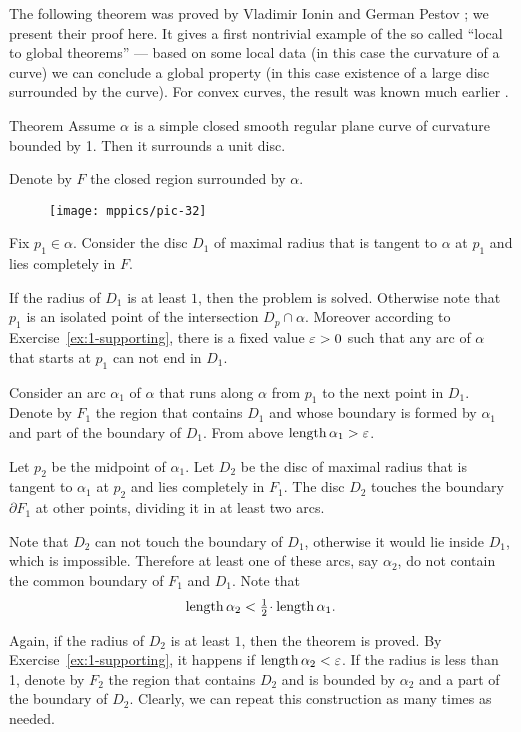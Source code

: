 The following theorem was proved by Vladimir Ionin and German Pestov \cite{pestov-ionin}; we present their proof here.
It gives a first nontrivial example of the so called ``local to global theorems'' --- based on some local data (in this case the curvature of a curve) we can conclude a global property (in this case existence of a large disc surrounded by the curve).
For convex curves, the result was known much earlier \cite[\S 24]{blaschke}.

\begin{thm}{Theorem}\label{thm:moon}
Assume $\alpha$ is a simple closed smooth regular plane curve of curvature bounded by 1.
Then it surrounds a unit disc.
\end{thm}

Denote by $F$ the closed region surrounded by $\alpha$. 

\begin{figure}[h!]%
\vskip-0mm
\centering
\texttt{[image: mppics/pic-32]}
\vskip0mm
\end{figure}

Fix $p_1\in \alpha$.
Consider the disc $D_1$ of maximal radius 
that is tangent to $\alpha$ at $p_1$ and lies completely in $F$.

If the radius of $D_1$ is at least $1$, then the problem is solved.
Otherwise note that $p_1$ is an isolated point of the intersection $D_p\cap \alpha$.
Moreover according to Exercise~\ref{ex:1-supporting}, there is a fixed value $\varepsilon>0$ such that any arc of $\alpha$
that starts at $p_1$ can not end in $D_1$.


Consider an arc $\alpha_1$ of $\alpha$ that runs along $\alpha$ from $p_1$ to the next point in $D_1$.
Denote by $F_1$ the region that contains $D_1$ and whose boundary is formed by $\alpha_1$ and part of the boundary of $D_1$.
From above $\mathop{\rm length}\nolimits \alpha_1>\varepsilon$.

Let $p_2$ be the midpoint of $\alpha_1$.
Let $D_2$ be the disc of maximal radius that is tangent to $\alpha_1$ at $p_2$ and lies completely in $F_1$. 
The disc $D_2$ touches the boundary $\partial F_1$ at other points, dividing it in at least two arcs.

Note that $D_2$ can not touch the boundary of $D_1$, otherwise it would lie inside $D_1$, which is impossible.
Therefore at least one of these arcs, say $\alpha_2$, do not contain the common boundary of $F_1$ and $D_1$.
Note that 
\[\length \alpha_2< \tfrac12\cdot\length\alpha_1.\]

Again, if the radius of $D_2$ is at least $1$, then the theorem is proved.
By Exercise~\ref{ex:1-supporting}, it happens if $\mathop{\rm length}\nolimits \alpha_2<\varepsilon$.
If the radius is less than 1, denote by $F_2$ the region that contains $D_2$ and is bounded by $\alpha_2$ and a part of the boundary of $D_2$. Clearly, we can repeat this construction as many times as needed. 


